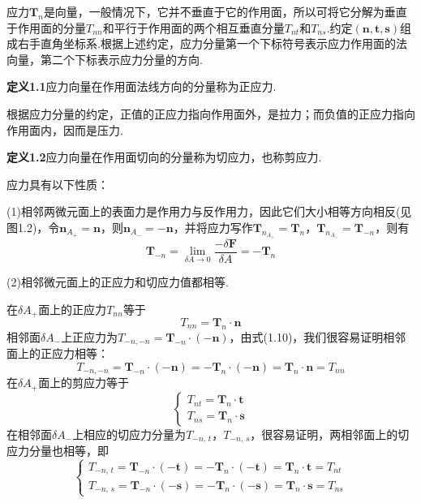 应力$\boldsymbol{T}_n$是向量，一般情况下，它并不垂直于它的作用面，所以可将它分解为垂直于作用面的分量$T_{nn}$和平行于作用面的两个相互垂直分量$T_{nt}$和$T_{ns}$.约定$(\boldsymbol{n},\boldsymbol{t},\boldsymbol{s})$组成右手直角坐标系.根据上述约定，应力分量第一个下标符号表示应力作用面的法向量，第二个下标表示应力分量的方向.

\noindent\textbf{定义1.1}\quad 应力向量在作用面法线方向的分量称为正应力.

根据应力分量的约定，正值的正应力指向作用面外，是拉力；而负值的正应力指向作用面内，因而是压力.

\noindent\textbf{定义1.2}\quad 应力向量在作用面切向的分量称为切应力，也称剪应力.

应力具有以下性质：

(1)相邻两微元面上的表面力是作用力与反作用力，因此它们大小相等方向相反(见图1.2)，令$\boldsymbol{n}_{A_+}=\boldsymbol{n}$，则$\boldsymbol{n}_{A_-}=-\boldsymbol{n}$，并将应力写作$\boldsymbol{T}_{n_{A_+}}=\boldsymbol{T}_n$，$\boldsymbol{T}_{n_{A_-}}=\boldsymbol{T}_{-n}$，则有
\begin{equation*}
\boldsymbol{T}_{-n}=\lim_{\delta A\to 0}\frac{-\delta\boldsymbol{F}}{\delta A}=-\boldsymbol{T}_n
\tag{1.10}
\end{equation*}

(2)相邻微元面上的正应力和切应力值都相等.

在$\delta A_+$面上的正应力$T_{nn}$等于
\begin{equation*}
T_{nn}=\boldsymbol{T}_n\cdot\boldsymbol{n}
\tag{1.11}
\end{equation*}
相邻面$\delta A_-$上正应力为$T_{-n,-n}=\boldsymbol{T}_{-n}\cdot(-\boldsymbol{n})$，由式(1.10)，我们很容易证明相邻面上的正应力相等：
\begin{equation*}
T_{-n,-n}=\boldsymbol{T}_{-n}\cdot(-\boldsymbol{n})=-\boldsymbol{T}_n\cdot(-\boldsymbol{n})=\boldsymbol{T}_n\cdot\boldsymbol{n}=T_{nn}
\tag{1.12}
\end{equation*}
在$\delta A_+$面上的剪应力等于
\begin{equation*}
\begin{cases}
T_{nt}=\boldsymbol{T}_n\cdot\boldsymbol{t}\\[2pt]
T_{ns}=\boldsymbol{T}_n\cdot\boldsymbol{s}
\end{cases}
\tag{1.13}
\end{equation*}
在相邻面$\delta A_-$上相应的切应力分量为$T_{-n,\,t}$，$T_{-n,\,s}$，很容易证明，两相邻面上的切应力分量也相等，即
\begin{equation*}
\begin{cases}
T_{-n,\,t}=\boldsymbol{T}_{-n}\cdot(-\boldsymbol{t})=-\boldsymbol{T}_n\cdot(-\boldsymbol{t})=\boldsymbol{T}_n\cdot\boldsymbol{t}=T_{nt}\\[2pt]
T_{-n,\,s}=\boldsymbol{T}_{-n}\cdot(-\boldsymbol{s})=-\boldsymbol{T}_n\cdot(-\boldsymbol{s})=\boldsymbol{T}_n\cdot\boldsymbol{s}=T_{ns}
\end{cases}
\tag{1.14}
\end{equation*}

